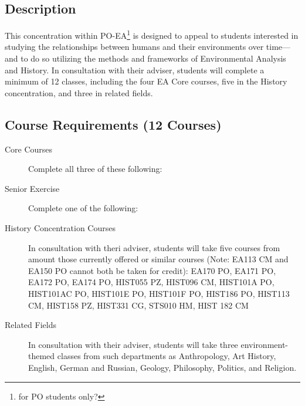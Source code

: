 \documentclass{article}\usepackage[]{graphicx}\usepackage[]{xcolor}
\newenvironment{itemize*}%
  {\begin{itemize}%
    \setlength{\itemsep}{0pt}%
    \setlength{\parskip}{0pt}}%
  {\end{itemize}}
\begin{document}
\subsection{Description}

This concentration within PO-EA\footnote{for PO students only?} is designed to appeal to students interested in studying the relationships between humans and their environments over time—and to do so utilizing the methods and frameworks of Environmental Analysis and History. In consultation with their adviser, students will complete a minimum of 12 classes, including the four EA Core courses, five in the History concentration, and three in related fields.

\subsection{Course Requirements (12 Courses)}

\begin{description}

 \item[Core Courses] Complete all three of these following:
  

  \item[Senior Exercise] Complete one of the following:
  


\item[History Concentration Courses] In consultation with theri adviser, students will take five courses from amount those currently offered or similar courses (Note: EA113 CM and EA150 PO cannot both be taken for credit): EA170 PO, EA171 PO, EA172 PO, EA174 PO, HIST055 PZ, HIST096 CM, HIST101A PO, HIST101AC PO, HIST101E PO, HIST101F PO, HIST186 PO, HIST113 CM, HIST158 PZ, HIST331 CG, STS010 HM, HIST 182 CM

\item[Related Fields] In consultation with their adviser, students will take three environment-themed classes from such departments as Anthropology, Art History, English, German and Russian, Geology, Philosophy, Politics, and Religion.

\end{description}
\end{document}
